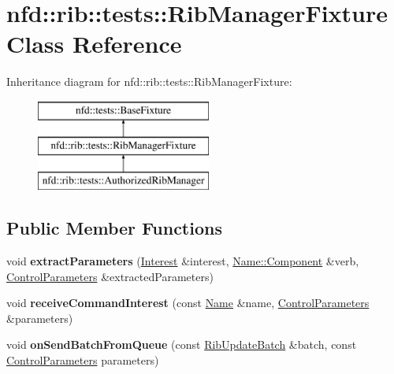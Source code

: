 \hypertarget{classnfd_1_1rib_1_1tests_1_1RibManagerFixture}{}\section{nfd\+:\+:rib\+:\+:tests\+:\+:Rib\+Manager\+Fixture Class Reference}
\label{classnfd_1_1rib_1_1tests_1_1RibManagerFixture}
Inheritance diagram for nfd\+:\+:rib\+:\+:tests\+:\+:Rib\+Manager\+Fixture\+:\begin{figure}[H]
\begin{center}
\leavevmode
\includegraphics[height=3.000000cm]{classnfd_1_1rib_1_1tests_1_1RibManagerFixture}
\end{center}
\end{figure}
\subsection*{Public Member Functions}
\begin{DoxyCompactItemize}
\item 
void {\bfseries extract\+Parameters} (\hyperlink{classndn_1_1Interest}{Interest} \&interest, \hyperlink{classndn_1_1name_1_1Component}{Name\+::\+Component} \&verb, \hyperlink{classndn_1_1nfd_1_1ControlParameters}{Control\+Parameters} \&extracted\+Parameters)\hypertarget{classnfd_1_1rib_1_1tests_1_1RibManagerFixture_a099bd40796c4f8e60b8ae30dd9a46cf6}{}\label{classnfd_1_1rib_1_1tests_1_1RibManagerFixture_a099bd40796c4f8e60b8ae30dd9a46cf6}

\item 
void {\bfseries receive\+Command\+Interest} (const \hyperlink{classndn_1_1Name}{Name} \&name, \hyperlink{classndn_1_1nfd_1_1ControlParameters}{Control\+Parameters} \&parameters)\hypertarget{classnfd_1_1rib_1_1tests_1_1RibManagerFixture_a9f97d2b117e68622168af899a5d4e51b}{}\label{classnfd_1_1rib_1_1tests_1_1RibManagerFixture_a9f97d2b117e68622168af899a5d4e51b}

\item 
void {\bfseries on\+Send\+Batch\+From\+Queue} (const \hyperlink{classnfd_1_1rib_1_1RibUpdateBatch}{Rib\+Update\+Batch} \&batch, const \hyperlink{classndn_1_1nfd_1_1ControlParameters}{Control\+Parameters} parameters)\hypertarget{classnfd_1_1rib_1_1tests_1_1RibManagerFixture_a358898578227334c122c36ef3787bb12}{}\label{classnfd_1_1rib_1_1tests_1_1RibManagerFixture_a358898578227334c122c36ef3787bb12}

\end{DoxyCompactItemize}

